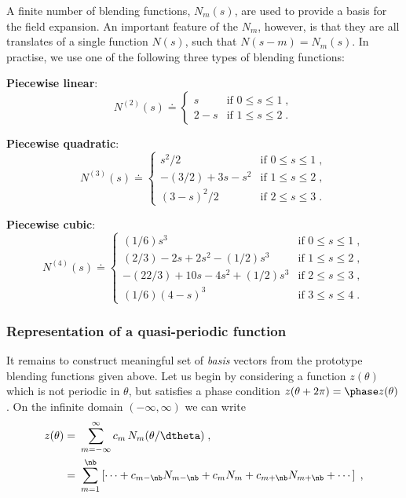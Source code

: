 A finite number of blending functions, $N_m(s)$, 
are used to provide a basis for the field expansion. An 
important feature of the $N_m$, however, is that they are 
all translates of a single function $N(s)$, such that 
$N(s-m) = N_m(s)$.  In practise, we use one of the 
following three types of blending functions:

\vskip 0.2in

\noindent
{\bf Piecewise linear}:
%
\begin{equation}
N^{(2)}(s) \doteq 
\begin{cases}
s &
\text{if $0 \leq s \leq 1$} \; , \\
2 - s &
\text{if $1 \leq s \leq 2$} \; .
\end{cases}
\end{equation}

\noindent
{\bf Piecewise quadratic}:
%
\begin{equation}
N^{(3)}(s) \doteq 
\begin{cases}
s^2/2 &
\text{if $0 \leq s \leq 1$} \; , \\
-(3/2)+3s-s^2 &
\text{if $1 \leq s \leq 2$} \; , \\
(3-s)^2/2 &
\text{if $2 \leq s \leq 3$} \; .
\end{cases}
\label{eq.quadraticfe}
\end{equation}

\noindent
{\bf Piecewise cubic}:
%
\begin{equation}
N^{(4)}(s) \doteq 
\begin{cases}
(1/6) s^3 &
\text{if $0 \leq s \leq 1$} \; , \\
(2/3)-2s+2s^2-(1/2)s^3 &
\text{if $1 \leq s \leq 2$} \; , \\
-(22/3)+10s-4s^2+(1/2)s^3 &
\text{if $2 \leq s \leq 3$} \; , \\
(1/6)(4-s)^3 &
\text{if $3 \leq s \leq 4$} \; .
\end{cases}
\end{equation}

\subsubsection{Representation of a quasi-periodic function}

It remains to construct meaningful set of 
{\sl basis} vectors from the prototype blending functions 
given above.  Let us begin by considering a function $z(\theta)$ 
which is not periodic in $\theta$, but satisfies a phase 
condition $z(\theta + 2\pi) = \phase z(\theta)$.  On the 
infinite domain $(-\infty,\infty)$ we can write
%
\begin{align}
z(\theta) = &~\sum_{m=-\infty}^{\infty} c_m \, N_m(\theta/\dtheta) \; , \\
          = &~\sum_{m=1}^{\nb} \left[ \cdots + 
c_{m-\nb}  N_{m-\nb} +
c_m  N_m +
c_{m+\nb}  N_{m+\nb} + \cdots \right] \; ,
\end{align}

